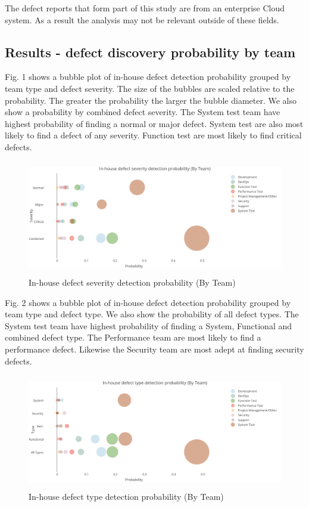 The defect reports that form part of this study are from an enterprise Cloud system. As a result the analysis may not be relevant outside of these fields. \par

\subsection{Results - defect discovery probability by team}

Fig. 1 shows a bubble plot of in-house defect detection probability grouped by team type and defect severity. The size of the bubbles are scaled relative to the probability. The greater the probability the larger the bubble diameter. We also
show a probability by combined defect severity. The System test team have highest probability of finding a normal or major defect. System test are also most likely to find a defect of any severity. Function test are most likely to find critical defects.


\begin{figure}
\begin{center}
\includegraphics[height=5cm, width=14cm]{graphs/dogfood/Graph1.png} 
\caption{In-house defect severity detection probability (By Team)}
\end{center}
\label{fig:inhouselikesev}
\end{figure}

Fig. 2 shows a bubble plot of in-house defect detection probability grouped by team type and defect type. We also
show the probability of all defect types. The System test team have highest probability of finding a System, Functional and combined defect type. The Performance team are most likely to find a performance defect. Likewise the Security team are most adept at finding security defects. 

\begin{figure}
\begin{center}
\includegraphics[height=5cm, width=14cm]{graphs/dogfood/Graph2.png} 
\caption{In-house defect type detection probability (By Team)}
\end{center}
\label{fig:inhouseliketype}
\end{figure}



